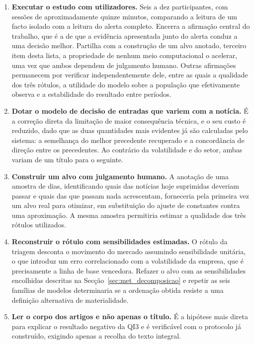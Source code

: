 \begin{enumerate}
  \item \textbf{Executar o estudo com utilizadores.} Seis a dez participantes, com sessões de
        aproximadamente quinze minutos, comparando a leitura de um facto isolado com a leitura do
        alerta completo. Encerra a afirmação central do trabalho, que é a de que a evidência
        apresentada junto do alerta conduz a uma decisão melhor. Partilha com a construção de um
        alvo anotado, terceiro item desta lista, a propriedade de nenhum meio computacional o
        acelerar, uma vez que ambos dependem de julgamento humano. Outras afirmações permanecem
        por verificar independentemente dele, entre as quais a qualidade dos três rótulos, a
        utilidade do modelo sobre a população que efetivamente observa e a estabilidade do
        resultado entre períodos.
  \item \textbf{Dotar o modelo de decisão de entradas que variem com a notícia.} É a correção direta
        da limitação de maior consequência técnica, e o seu custo é reduzido, dado que as duas
        quantidades mais evidentes já são calculadas pelo sistema: a semelhança do melhor precedente
        recuperado e a concordância de direção entre os precedentes. Ao contrário da volatilidade e
        do setor, ambas variam de um título para o seguinte.

  \item \textbf{Construir um alvo com julgamento humano.} A anotação de uma amostra de dias,
        identificando quais das notícias hoje suprimidas deveriam passar e quais das que passam nada
        acrescentam, forneceria pela primeira vez um alvo real para otimizar, em substituição do
        ajuste de constantes contra uma aproximação. A mesma amostra permitiria estimar a qualidade
        dos três rótulos utilizados.

  \item \textbf{Reconstruir o rótulo com sensibilidades estimadas.} O rótulo da triagem desconta o
        movimento do mercado assumindo sensibilidade unitária, o que introduz um erro correlacionado
        com a volatilidade da empresa, que é precisamente a linha de base vencedora. Refazer o alvo
        com as sensibilidades encolhidas descritas na Secção~\ref{sec:met_decomposicao} e repetir as
        seis famílias de modelos determinaria se a ordenação obtida resiste a uma definição
        alternativa de materialidade.

  \item \textbf{Ler o corpo dos artigos e não apenas o título.} É a hipótese mais direta para
        explicar o resultado negativo da \gls{QI}3 e é verificável com o protocolo já construído,
        exigindo apenas a recolha do texto integral.


\end{enumerate}
